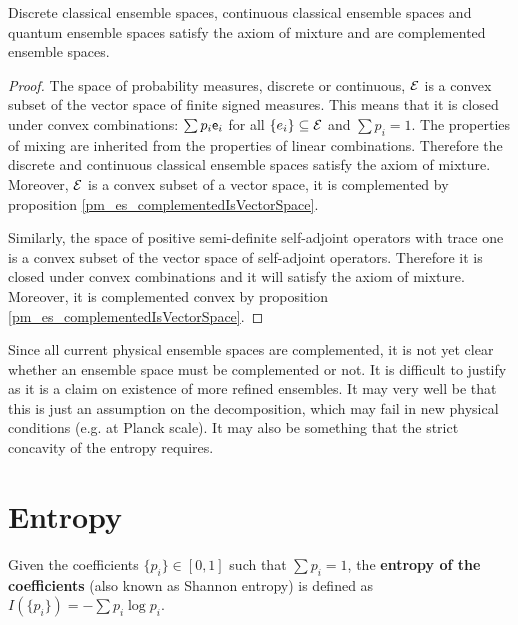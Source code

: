 \begin{prop}
	Discrete classical ensemble spaces, continuous classical ensemble spaces and quantum ensemble spaces satisfy the axiom of mixture and are complemented ensemble spaces.
\end{prop}

\begin{proof}
	The space of probability measures, discrete or continuous, $\mathcal{E}$ is a convex subset of the vector space of finite signed measures. This means that it is closed under convex combinations: $\sum p_i \mathsf{e}_i$ for all $\{e_i\} \subseteq \mathcal{E}$ and $\sum p_i = 1$. The properties of mixing are inherited from the properties of linear combinations. Therefore the discrete and continuous classical ensemble spaces satisfy the axiom of mixture. Moreover, $\mathcal{E}$ is a convex subset of a vector space, it is complemented by proposition \ref{pm_es_complementedIsVectorSpace}.
	
	Similarly, the space of positive semi-definite self-adjoint operators with trace one is a convex subset of the vector space of self-adjoint operators. Therefore it is closed under convex combinations and it will satisfy the axiom of mixture. Moreover, it is complemented convex by proposition \ref{pm_es_complementedIsVectorSpace}.
\end{proof}


\begin{remark}
	Since all current physical ensemble spaces are complemented, it is not yet clear whether an ensemble space must be complemented or not. It is difficult to justify as it is a claim on existence of more refined ensembles. It may very well be that this is just an assumption on the decomposition, which may fail in new physical conditions (e.g. at Planck scale). It may also be something that the strict concavity of the entropy requires.
\end{remark}


\section{Entropy}

\begin{defn}
	Given the coefficients $\{p_i\} \in [0,1]$ such that $\sum p_i = 1$, the \textbf{entropy of the coefficients} (also known as Shannon entropy) is defined as $I(\{p_i\}) = - \sum p_i \log p_i $.
\end{defn}

